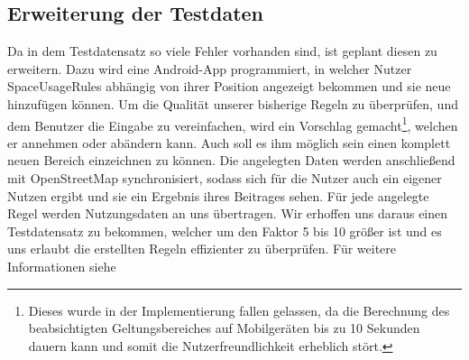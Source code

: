 \subsection{Erweiterung der Testdaten}
Da in dem Testdatensatz so viele Fehler vorhanden sind, ist geplant diesen zu erweitern. Dazu wird eine Android-App programmiert, in welcher Nutzer SpaceUsageRules
abhängig von ihrer Position angezeigt bekommen und sie neue hinzufügen können.
Um die Qualität unserer bisherige Regeln zu überprüfen, und dem Benutzer die Eingabe zu vereinfachen, wird ein Vorschlag gemacht\footnote{Dieses wurde in der Implementierung fallen gelassen,
da die Berechnung des beabsichtigten Geltungsbereiches auf Mobilgeräten bis zu 10 Sekunden dauern kann und somit die Nutzerfreundlichkeit erheblich stört.},
welchen er annehmen oder abändern kann.
Auch soll es ihm möglich sein einen komplett neuen Bereich einzeichnen zu können.
Die angelegten Daten werden anschließend mit OpenStreetMap synchronisiert, sodass sich für die Nutzer auch ein eigener Nutzen ergibt
und sie ein Ergebnis ihres Beitrages sehen.
Für jede angelegte Regel werden Nutzungsdaten an uns übertragen.
Wir erhoffen uns daraus einen Testdatensatz zu bekommen, welcher um den Faktor 5 bis 10 größer ist und es uns erlaubt die erstellten Regeln effizienter zu überprüfen.
Für weitere Informationen siehe 
